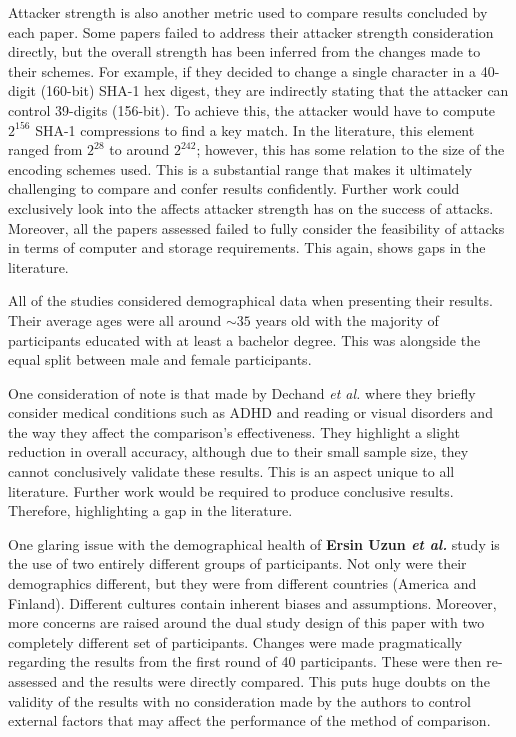 Attacker strength is also another metric used to compare results concluded by each paper. Some papers failed to address their attacker strength consideration directly, but the overall strength has been inferred from the changes made to their schemes. For example, if they decided to change a single character in a 40-digit (160-bit) SHA-1 hex digest, they are indirectly stating that the attacker can control 39-digits (156-bit). To achieve this, the attacker would have to compute $2^{156}$ SHA-1 compressions to find a key match.
In the literature, this element ranged from $2^{28}$ to around $2^{242}$; however, this has some relation to the size of the encoding schemes used. This is a substantial range that makes it ultimately challenging to compare and confer results confidently. Further work could exclusively look into the affects attacker strength has on the success of attacks. Moreover, all the papers assessed failed to fully consider the feasibility of attacks in terms of computer and storage requirements. This again, shows gaps in the literature. 

All of the studies considered demographical data when presenting their results. Their average ages were all around $\sim35$ years old with the majority of participants educated with at least a bachelor degree. This was alongside the equal split between male and female participants.

One consideration of note is that made by Dechand \textit{et al.} \cite{dechand2016empirical} where they briefly consider medical conditions such as ADHD and reading or visual disorders and the way they affect the comparison's effectiveness. They highlight a slight reduction in overall accuracy, although due to their small sample size, they cannot conclusively validate these results. This is an aspect unique to all literature. Further work would be required to produce conclusive results. Therefore, highlighting a gap in the literature.

One glaring issue with the demographical health of \textbf{Ersin Uzun \textit{et al.}}\cite{uzun2007usability} study is the use of two entirely different groups of participants. Not only were their demographics different, but they were from different countries (America and Finland). Different cultures contain inherent biases and assumptions. Moreover, more concerns are raised around the dual study design of this paper with two completely different set of participants. Changes were made pragmatically regarding the results from the first round of 40 participants. These were then re-assessed and the results were directly compared. This puts huge doubts on the validity of the results with no consideration made by the authors to control external factors that may affect the performance of the method of comparison.

